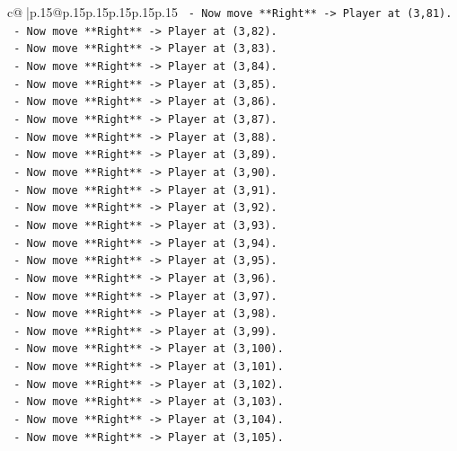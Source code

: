 \documentclass{article}
\begin{document}
{\begin{supertabular}{c@{$\;$}|p{.15\linewidth}@{}p{.15\linewidth}p{.15\linewidth}p{.15\linewidth}p{.15\linewidth}p{.15\linewidth}}
{{{\texttt{    {-}   Now move **Right** {-}> Player at (3,81).} \\
\texttt{    {-}   Now move **Right** {-}> Player at (3,82).} \\
\texttt{    {-}   Now move **Right** {-}> Player at (3,83).} \\
\texttt{    {-}   Now move **Right** {-}> Player at (3,84).} \\
\texttt{    {-}   Now move **Right** {-}> Player at (3,85).} \\
\texttt{    {-}   Now move **Right** {-}> Player at (3,86).} \\
\texttt{    {-}   Now move **Right** {-}> Player at (3,87).} \\
\texttt{    {-}   Now move **Right** {-}> Player at (3,88).} \\
\texttt{    {-}   Now move **Right** {-}> Player at (3,89).} \\
\texttt{    {-}   Now move **Right** {-}> Player at (3,90).} \\
\texttt{    {-}   Now move **Right** {-}> Player at (3,91).} \\
\texttt{    {-}   Now move **Right** {-}> Player at (3,92).} \\
\texttt{    {-}   Now move **Right** {-}> Player at (3,93).} \\
\texttt{    {-}   Now move **Right** {-}> Player at (3,94).} \\
\texttt{    {-}   Now move **Right** {-}> Player at (3,95).} \\
\texttt{    {-}   Now move **Right** {-}> Player at (3,96).} \\
\texttt{    {-}   Now move **Right** {-}> Player at (3,97).} \\
\texttt{    {-}   Now move **Right** {-}> Player at (3,98).} \\
\texttt{    {-}   Now move **Right** {-}> Player at (3,99).} \\
\texttt{    {-}   Now move **Right** {-}> Player at (3,100).} \\
\texttt{    {-}   Now move **Right** {-}> Player at (3,101).} \\
\texttt{    {-}   Now move **Right** {-}> Player at (3,102).} \\
\texttt{    {-}   Now move **Right** {-}> Player at (3,103).} \\
\texttt{    {-}   Now move **Right** {-}> Player at (3,104).} \\
\texttt{    {-}   Now move **Right** {-}> Player at (3,105).} \\
}}}
\end{supertabular}}
\end{document}

